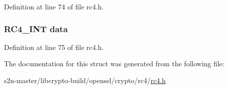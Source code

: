 Definition at line 74 of file rc4.\+h.

\subsubsection[{\texorpdfstring{data}{data}}]{\setlength{\rightskip}{0pt plus 5cm}R\+C4\+\_\+\+I\+NT data}\hypertarget{structrc4__key__st_a2baaa96472216bbb3d5aa80f5ebd2bfc}{}\label{structrc4__key__st_a2baaa96472216bbb3d5aa80f5ebd2bfc}


Definition at line 75 of file rc4.\+h.



The documentation for this struct was generated from the following file\+:\begin{DoxyCompactItemize}
\item 
s2n-\/master/libcrypto-\/build/openssl/crypto/rc4/\hyperlink{crypto_2rc4_2rc4_8h}{rc4.\+h}\end{DoxyCompactItemize}
